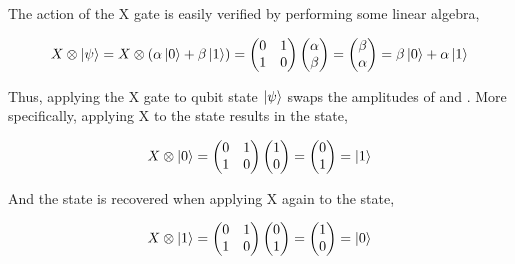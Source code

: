 The action of the X gate is easily verified by performing some linear algebra,

\begin{equation}
\label{equ:xverification1}
X \otimes \ket{\psi} = X \otimes (\alpha \ket{0} + \beta \ket{1}) = \begin{pmatrix}
 0 & 1 \\ 
 1 & 0
 \end{pmatrix} \begin{pmatrix}
 \alpha  \\ 
 \beta
 \end{pmatrix} = \begin{pmatrix}
 \beta  \\ 
 \alpha
 \end{pmatrix} = \beta \ket{0} + \alpha \ket{1}
\end{equation}

Thus, applying the X gate to qubit state $\ket{\psi}$ swaps the amplitudes of \0 and \1. More specifically, applying X to the \0 state results in the \1 state,

\begin{equation}
\label{equ:xverification2}
X \otimes \ket{0} = \begin{pmatrix}
 0 & 1 \\ 
 1 & 0
 \end{pmatrix} \begin{pmatrix}
 1  \\ 
 0
 \end{pmatrix} = \begin{pmatrix}
 0  \\ 
 1 \end{pmatrix} =  \ket{1}
\end{equation}

And the \0 state is recovered when applying X again to the \1 state,

\begin{equation}
\label{equ:xverification3}
X \otimes \ket{1} = \begin{pmatrix}
 0 & 1 \\ 
 1 & 0
 \end{pmatrix} \begin{pmatrix}
 0  \\ 
 1
 \end{pmatrix} = \begin{pmatrix}
 1  \\ 
 0 \end{pmatrix} =  \ket{0}
\end{equation}

